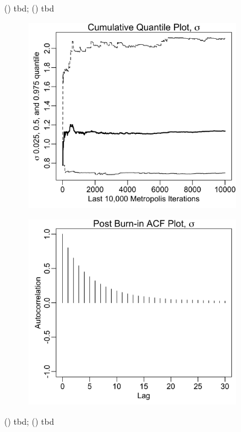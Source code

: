 \documentclass{uwstat572}
\begin{document}
\begin{figure}[H]
\begin{subfigure}[b]{0.49\textwidth}
		\caption{}
		\label{fig:acf_mu}
	\end{subfigure}
	\caption{() tbd; () tbd }
	\label{fig:data_plot}
\end{figure} 

\begin{figure}[H]
	\centering
	\begin{subfigure}[b]{0.49\textwidth}
		\includegraphics[width=\textwidth]{figures/mcmc_cum_quant_plot_sigma.png}
		\caption{}
		\label{fig:quant_sigma}
	\end{subfigure}
	\hfill
	\begin{subfigure}[b]{0.49\textwidth}
		\includegraphics[width=\textwidth]{figures/mcmc_acf_plot_sigma.png}
		\caption{}
		\label{fig:acf_sigma}
	\end{subfigure}
	\caption{() tbd; () tbd }
	\label{fig:data_plot}
\end{figure} 
\end{document}
